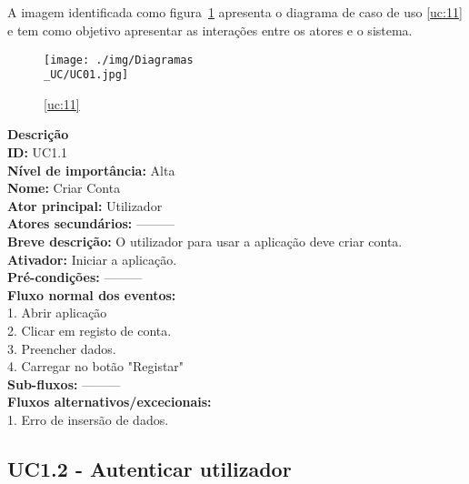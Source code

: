 \subsection{}
A imagem identificada como figura~\ref{fig:chap211} apresenta o diagrama de caso de uso \ref{uc:11} e tem como objetivo apresentar as interações entre os atores e o sistema.

\vspace*{5mm}

\begin{figure}[H]
	\centering
	\texttt{[image: ./img/Diagramas\\\_UC/UC01.jpg]}  %
	\caption{\ref{uc:11}}
	\label{fig:chap211}
\end{figure}

\noindent \textbf{Descrição} \\
\textbf{ID:} UC1.1 \\  
\textbf{Nível de importância:} Alta \\
\textbf{Nome:} Criar Conta \\
\textbf{Ator principal:} Utilizador \\
\textbf{Atores secundários:} --------- \\
\textbf{Breve descrição:} O utilizador para usar a aplicação deve criar conta. \\ 
\textbf{Ativador:} Iniciar a aplicação.  \\
\textbf{Pré-condições:} --------- \\
\textbf{Fluxo normal dos eventos:} \\
1. Abrir aplicação  \\
2. Clicar em registo de conta. \\
3. Preencher dados. \\
4. Carregar no botão "Registar"  \\
\textbf{Sub-fluxos:} --------- \\
\textbf{Fluxos alternativos/excecionais:}  \\
1. Erro de insersão de dados. \\

\subsection{UC1.2 - Autenticar utilizador}
\vspace*{5mm}

